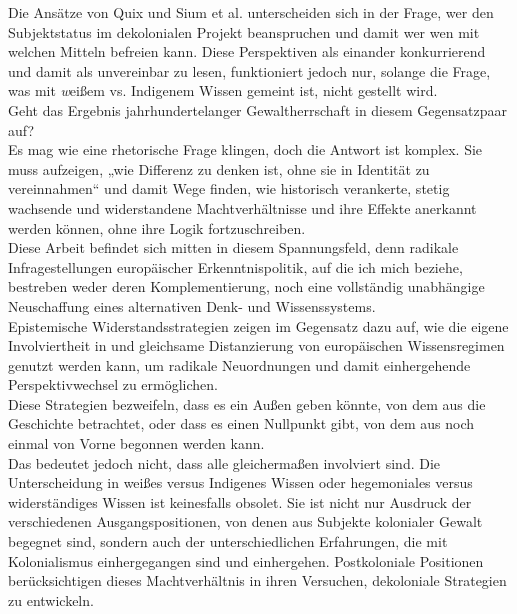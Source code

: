 Die Ansätze von Quix und Sium et al. unterscheiden sich in der Frage, wer den
Subjektstatus im dekolonialen Projekt beanspruchen und damit wer wen mit
welchen Mitteln befreien kann. Diese Perspektiven als einander konkurrierend
und damit als unvereinbar zu lesen, funktioniert jedoch nur, solange die Frage,
was mit \textit{w}eißem vs. Indigenem Wissen gemeint ist, nicht gestellt wird.\\
Geht das Ergebnis jahrhundertelanger Gewaltherrschaft in diesem Gegensatzpaar
auf?\\
Es mag wie eine rhetorische Frage klingen, doch die Antwort ist komplex. Sie
muss aufzeigen, „wie Differenz zu denken ist, ohne sie in Identität zu
vereinnahmen“\footnotemark{} und damit Wege finden, wie historisch verankerte, stetig
wachsende und widerstandene Machtverhältnisse und ihre Effekte anerkannt werden
können, ohne ihre Logik fortzuschreiben.\\
Diese Arbeit befindet sich mitten in
diesem Spannungsfeld, denn radikale Infragestellungen europäischer
Erkenntnispolitik, auf die ich mich beziehe, bestreben weder deren
Komplementierung, noch eine vollständig unabhängige Neuschaffung eines
alternativen Denk- und Wissenssystems.\\
Epistemische
Widerstandsstrategien\footnotemark{} zeigen im Gegensatz dazu
  auf, wie die eigene Involviertheit in und gleichsame Distanzierung von
  europäischen Wissensregimen genutzt werden kann, um radikale Neuordnungen und
  damit einhergehende Perspektivwechsel zu ermöglichen.\\
  Diese Strategien bezweifeln, dass es ein Außen geben könnte, von dem aus die
  Geschichte betrachtet, oder dass es einen Nullpunkt gibt, von dem aus noch
  einmal von Vorne begonnen werden kann.\\
  Das bedeutet jedoch nicht, dass alle gleichermaßen involviert sind. Die
  Unterscheidung in weißes versus Indigenes Wissen oder hegemoniales versus
  widerständiges Wissen ist keinesfalls obsolet. Sie ist nicht nur Ausdruck der
  verschiedenen Ausgangspositionen, von denen aus Subjekte kolonialer Gewalt
  begegnet sind, sondern auch der unterschiedlichen Erfahrungen, die mit
  Kolonialismus einhergegangen sind und einhergehen. Postkoloniale Positionen
  berücksichtigen dieses Machtverhältnis in ihren Versuchen, dekoloniale
  Strategien zu entwickeln.\\

